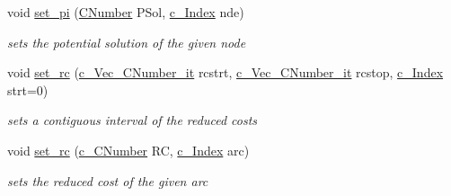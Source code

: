 \begin{Indent}
\begin{DoxyCompactItemize}
void \mbox{\hyperlink{class_s_m_spp__di__unipi__it_1_1_m_c_f_block_a4b966ba9e5ad2eec5bf1e1f80f4160fc}{set\+\_\+pi}} (\mbox{\hyperlink{class_s_m_spp__di__unipi__it_1_1_m_c_f_block_a24d0627ba8213afe1ec4ebeb4508e8f1}{C\+Number}} P\+Sol, \mbox{\hyperlink{class_s_m_spp__di__unipi__it_1_1_m_c_f_block_aee6156e2ce80720d57a082d80f39d8cc}{c\+\_\+\+Index}} nde)
\begin{DoxyCompactList}\small\item\em sets the potential solution of the given node \end{DoxyCompactList}\item 
void \mbox{\hyperlink{class_s_m_spp__di__unipi__it_1_1_m_c_f_block_ace95d7a2ee61c1dfadb7f2ac02c99a81}{set\+\_\+rc}} (\mbox{\hyperlink{class_s_m_spp__di__unipi__it_1_1_m_c_f_block_aa2211b659beb942cfb7618c11033831e}{c\+\_\+\+Vec\+\_\+\+C\+Number\+\_\+it}} rcstrt, \mbox{\hyperlink{class_s_m_spp__di__unipi__it_1_1_m_c_f_block_aa2211b659beb942cfb7618c11033831e}{c\+\_\+\+Vec\+\_\+\+C\+Number\+\_\+it}} rcstop, \mbox{\hyperlink{class_s_m_spp__di__unipi__it_1_1_m_c_f_block_aee6156e2ce80720d57a082d80f39d8cc}{c\+\_\+\+Index}} strt=0)
\begin{DoxyCompactList}\small\item\em sets a contiguous interval of the reduced costs \end{DoxyCompactList}\item 
\mbox{\label{class_s_m_spp__di__unipi__it_1_1_m_c_f_block_a3f7766d63bb784fd7017e99eeb469457}} 
void \mbox{\hyperlink{class_s_m_spp__di__unipi__it_1_1_m_c_f_block_a3f7766d63bb784fd7017e99eeb469457}{set\+\_\+rc}} (\mbox{\hyperlink{class_s_m_spp__di__unipi__it_1_1_m_c_f_block_a8e47cae4e16e180273d262aae769a854}{c\+\_\+\+C\+Number}} RC, \mbox{\hyperlink{class_s_m_spp__di__unipi__it_1_1_m_c_f_block_aee6156e2ce80720d57a082d80f39d8cc}{c\+\_\+\+Index}} arc)
\begin{DoxyCompactList}\small\item\em sets the reduced cost of the given arc \end{DoxyCompactList}\end{DoxyCompactItemize}
\end{Indent}
